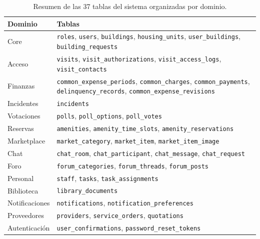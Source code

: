 \begin{table}[H]
\centering
\small
\begin{tabular}{|l|p{}|}
\hline
\textbf{Dominio} & \textbf{Tablas} \\ \hline
Core & \texttt{roles}, \texttt{users}, \texttt{buildings}, \texttt{housing\_units}, \texttt{user\_buildings}, \texttt{building\_requests} \\ \hline
Acceso & \texttt{visits}, \texttt{visit\_authorizations}, \texttt{visit\_access\_logs}, \texttt{visit\_contacts} \\ \hline
Finanzas & \texttt{common\_expense\_periods}, \texttt{common\_charges}, \texttt{common\_payments}, \texttt{delinquency\_records}, \texttt{common\_expense\_revisions} \\ \hline
Incidentes & \texttt{incidents} \\ \hline
Votaciones & \texttt{polls}, \texttt{poll\_options}, \texttt{poll\_votes} \\ \hline
Reservas & \texttt{amenities}, \texttt{amenity\_time\_slots}, \texttt{amenity\_reservations} \\ \hline
Marketplace & \texttt{market\_category}, \texttt{market\_item}, \texttt{market\_item\_image} \\ \hline
Chat & \texttt{chat\_room}, \texttt{chat\_participant}, \texttt{chat\_message}, \texttt{chat\_request} \\ \hline
Foro & \texttt{forum\_categories}, \texttt{forum\_threads}, \texttt{forum\_posts} \\ \hline
Personal & \texttt{staff}, \texttt{tasks}, \texttt{task\_assignments} \\ \hline
Biblioteca & \texttt{library\_documents} \\ \hline
Notificaciones & \texttt{notifications}, \texttt{notification\_preferences} \\ \hline
Proveedores & \texttt{providers}, \texttt{service\_orders}, \texttt{quotations} \\ \hline
Autenticación & \texttt{user\_confirmations}, \texttt{password\_reset\_tokens} \\ \hline
\end{tabular}
\caption{Resumen de las 37 tablas del sistema organizadas por dominio.}
\end{table}

